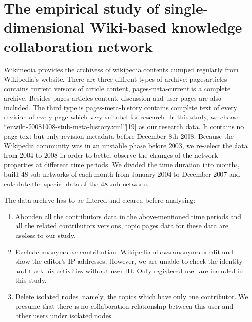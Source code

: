 \documentclass{elsarticle}
\begin{document}
\section{The empirical study of single-dimensional Wiki-based knowledge collaboration network}
\label{sec:empir-study-single}
Wikimedia provides the archivess of  wikipedia contents dumped
regularly from
Wikipedia's website.  There are three diffrent types of archive: 
pages\nobreakdash{-}articles contains current versons of article content,
pages-meta-current is  a   complete archive. Besides pages-articles
content, discussion and user pages are also included.  The third type
is pages-meta-history contains complete text of every revision of
every page which very suitabel  for research.
In this study, we choose
“enwiki-20081008-stub-meta-history.xml”[19] as our research
data. It contains no page text but only revision metadata before
December 8th 2008. Because the Wikipedia community was in an unstable
phase before 2003, we re-select the data from 2004 to 2008 in order to
better observe the changes of the network  properties at different time periods. We divided the time duration into months, build 48 sub-networks of each month from January 2004 to December 2007 and calculate the special data of the 48 sub-networks.

The data archive has to be filtered and cleared before analysing:
\begin{enumerate}
\item Abonden all the contributors data in the above-mentioned time
  periods and all the related contributors versions, topic pages data
  for these data are useless to our study.
\item Exclude anonymouse contribution. Wikipedia allows anonymous edit
  and show the editor's IP addresses. However, we are unable to check
  the identity and track his activities without user ID. Only
  registered user are included in this study.
\item Delete isolated nodes, namely, the topics which have only one
  contributor. We presume that there is no collaboration relationship
  between this user and other users under isolated nodes.

\end{enumerate}
 
\end{document}
